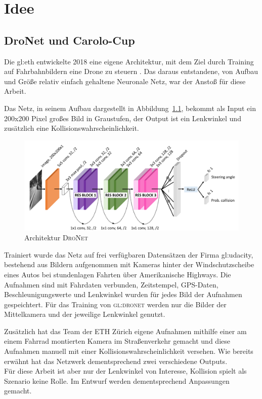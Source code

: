 %
\chapter{Idee}

\section{DroNet und Carolo-Cup}

Die \gls{gl:eth} entwickelte 2018 eine eigene Architektur, mit dem Ziel durch Training auf Fahrbahnbildern eine Drone zu steuern \cite{Loquercio_2018}. 
Das daraus entstandene, von Aufbau und Größe relativ einfach gehaltene Neuronale Netz, war der Anstoß für diese Arbeit. 

Das Netz, in seinem Aufbau dargestellt in Abbildung~\ref{img:DroNet}, bekommt als Input ein 200x200 Pixel großes Bild in Graustufen, der Output ist ein Lenkwinkel und zusätzlich eine Kollisionswahrscheinlichkeit.

\begin{figure}[h]
	\centering
	\includegraphics[scale=0.5]{figures/Architecture-DRONET.png}
	\caption{Architektur \textsc{DroNet}}
	\label{img:DroNet}
\end{figure}

Trainiert wurde das Netz auf frei verfügbaren Datensätzen der Firma \gls{gl:udacity}, bestehend aus Bildern aufgenommen mit Kameras hinter der Windschutzscheibe eines Autos bei stundenlagen Fahrten über Amerikanische Highways. Die Aufnahmen sind mit Fahrdaten verbunden, Zeitstempel, GPS-Daten, Beschleunigungswerte und Lenkwinkel wurden für jedes Bild der Aufnahmen gespeichtert. Für das Training von \textsc{\gls{gl:dronet}} werden nur die Bilder der Mittelkamera und der jeweilige Lenkwinkel genutzt.

Zusätzlich hat das Team der ETH Zürich eigene Aufnahmen mithilfe einer am einem Fahrrad montierten Kamera im Straßenverkehr gemacht und diese Aufnahmen manuell mit einer Kollisionswahrscheinlichkeit versehen. Wie bereits erwähnt hat das Netzwerk dementsprechend zwei verschiedene Outputs.\\
Für diese Arbeit ist aber nur der Lenkwinkel von Interesse, Kollision spielt als Szenario keine Rolle. Im Entwurf werden dementsprechend Anpassungen gemacht.

